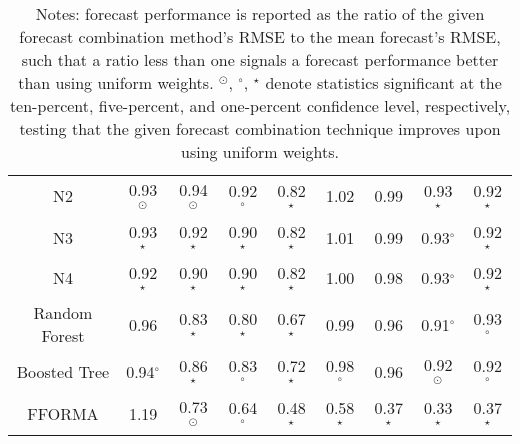 \begin{table}[ht]
{\begin{tabular}{ccccccccc}
  N2 & 0.93$^\odot$ & 0.94$^\odot$ & 0.92$^\circ$ & 0.82$^\star$ & 1.02 & 0.99 & 0.93$^\star$ & 0.92$^\star$ \\ 
  N3 & 0.93$^\star$ & 0.92$^\star$ & 0.90$^\star$ & 0.82$^\star$ & 1.01 & 0.99 & 0.93$^\circ$ & 0.92$^\star$ \\ 
  N4 & 0.92$^\star$ & 0.90$^\star$ & 0.90$^\star$ & 0.82$^\star$ & 1.00 & 0.98 & 0.93$^\circ$ & 0.92$^\star$ \\ 
  Random Forest & 0.96 & 0.83$^\star$ & 0.80$^\star$ & 0.67$^\star$ & 0.99 & 0.96 & 0.91$^\circ$ & 0.93$^\circ$ \\ 
  Boosted Tree & 0.94$^\circ$ & 0.86$^\star$ & 0.83$^\circ$ & 0.72$^\star$ & 0.98$^\circ$ & 0.96 & 0.92$^\odot$ & 0.92$^\circ$ \\ 
  FFORMA & 1.19 & 0.73$^\odot$ & 0.64$^\circ$ & 0.48$^\star$ & 0.58$^\star$ & 0.37$^\star$ & 0.33$^\star$ & 0.37$^\star$ \\
  \hline
  \hline
\end{tabular}}
\caption*{Notes: forecast performance is reported as the ratio of the given forecast combination method's RMSE to the mean forecast's RMSE, such that a ratio less than one signals a forecast performance better than using uniform weights. $^\odot$, $^\circ$, $^\star$ denote \cite{DM1995} statistics significant at the ten-percent, five-percent, and one-percent confidence level, respectively, testing that the given forecast combination technique improves upon using uniform weights.}
\end{table}